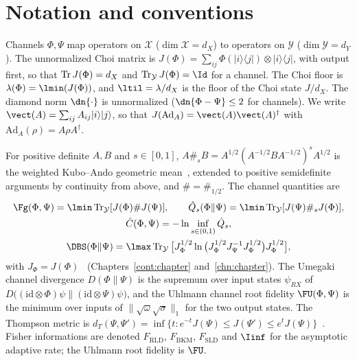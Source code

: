 \section{Notation and conventions}\label{gate:sec:notation}

Channels $\Phi,\Psi$ map operators on $\mathcal X$ ($\dim\mathcal X=d_X$) to operators on $\mathcal Y$ ($\dim\mathcal Y=d_Y$). The unnormalized Choi matrix is $J(\Phi)=\sum_{ij}\Phi(|i\rangle\langle j|)\otimes|i\rangle\langle j|$, with output first, so that $\operatorname{Tr} J(\Phi)=d_X$ and $\Tr_{\mathcal Y}J(\Phi)=\Id$ for a channel. The Choi floor is $\lambda(\Phi)=\lmin(J(\Phi))$, and $\ltil=\lambda/d_X$ is the floor of the Choi state $J/d_X$. The diamond norm $\dn{\cdot}$ is unnormalized ($\dn{\Phi-\Psi}\le2$ for channels). We write $\vect(A)=\sum_{ij}A_{ij}|i\rangle|j\rangle$, so that $J(\mathrm{Ad}_A)=\vect(A)\vect(A)^\dagger$ with $\mathrm{Ad}_A(\rho)=A\rho A^\dagger$.

For positive definite $A,B$ and $s\in[0,1]$, $A\#_sB=A^{1/2}(A^{-1/2}BA^{-1/2})^sA^{1/2}$ is the weighted Kubo--Ando geometric mean~\cite{KuboAndo1980}, extended to positive semidefinite arguments by continuity from above, and $\#=\#_{1/2}$. The channel quantities are
\begin{gather}
\Fg(\Phi,\Psi)=\lmin\Tr_{\mathcal Y}[J(\Phi)\#J(\Psi)],\qquad \hat Q_s(\Phi\|\Psi)=\lmin\Tr_{\mathcal Y}[J(\Psi)\#_sJ(\Phi)],\notag\\
\hat C(\Phi,\Psi)=-\ln\inf_{s\in(0,1)}\hat Q_s,\\
\DBS(\Phi\|\Psi)=\lmax\Tr_{\mathcal Y}\big[J_\Phi^{1/2}\ln\big(J_\Phi^{1/2}J_\Psi^{-1}J_\Phi^{1/2}\big)J_\Phi^{1/2}\big],
\end{gather}
with $J_\Phi=J(\Phi)$~\cite{FangFawzi2021,KatariyaWilde2021} (Chapters~\ref{cont:chapter} and~\ref{chn:chapter}). The Umegaki channel divergence $D(\Phi\|\Psi)$ is the supremum over input states $\psi_{R X}$ of $D\big((\mathrm{id}\otimes\Phi)\psi\|(\mathrm{id}\otimes\Psi)\psi\big)$, and the Uhlmann channel root fidelity $\FU(\Phi,\Psi)$ is the minimum over inputs of $\|\sqrt{\omega}\sqrt{\sigma}\|_1$ for the two output states. The Thompson metric is $d_T(\Psi,\Psi')=\inf\{t:e^{-t}J(\Psi)\le J(\Psi')\le e^tJ(\Psi)\}$~\cite{Thompson1963}. Fisher informations are denoted $F_{\mathrm{RLD}}$, $F_{\mathrm{BKM}}$, $F_{\mathrm{SLD}}$ and $\Iinf$ for the asymptotic adaptive rate; the Uhlmann root fidelity is $\FU$.

